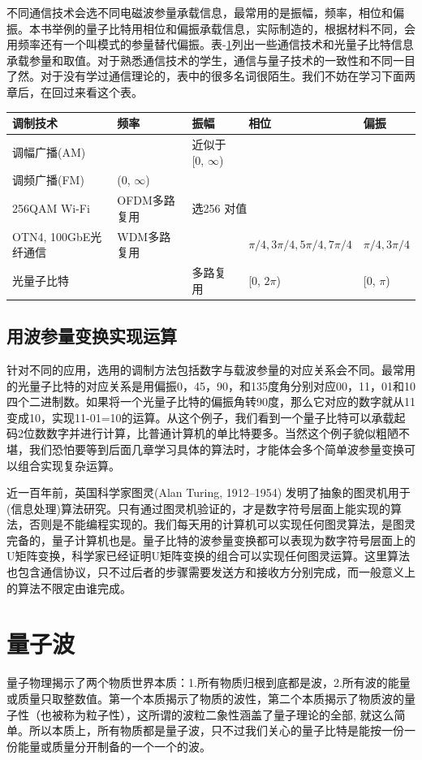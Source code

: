 \documentclass{ctexbook}
\begin{document}
不同通信技术会选不同电磁波参量承载信息，最常用的是振幅，频率，相位和偏振。本书举例的量子比特用相位和偏振承载信息，实际制造的，根据材料不同，会用频率还有一个叫模式的参量替代偏振。表-\ref{t-modulations}列出一些通信技术和光量子比特信息承载参量和取值。对于熟悉通信技术的学生，通信与量子技术的一致性和不同一目了然。对于没有学过通信理论的，表中的很多名词很陌生。我们不妨在学习下面两章后，在回过来看这个表。
\begin{table}[]\label{t-modulations}
\begin{tabular}{|l|l|l|l|l|}
\hline
调制技术 & 频率 & 振幅 & 相位 & 偏振   \\ \hline
调幅广播(AM) &  & 近似于[0, $\infty$) &  & \\ \hline
调频广播(FM) & (0, $\infty$) &  &  &  \\ \hline
256QAM Wi-Fi & OFDM多路复用 & \multicolumn{2}{l|}{选256 对值} & \\ \hline
OTN4, 100GbE光纤通信 & WDM多路复用 &  & $\pi/4, 3\pi/4, 5\pi/4, 7\pi/4$ & $\pi/4, 3\pi/4$ \\ \hline
光量子比特 &  & 多路复用 & [0, $2\pi$) & [0, $\pi$) \\ \hline
\end{tabular}
\end{table}

\subsection{用波参量变换实现运算}
针对不同的应用，选用的调制方法包括数字与载波参量的对应关系会不同。最常用的光量子比特的对应关系是用偏振0，45，90，和135度角分别对应00，11，01和10四个二进制数。如果将一个光量子比特的偏振角转90度，那么它对应的数字就从11变成10，实现11-01=10的运算。从这个例子，我们看到一个量子比特可以承载起码2位数数字并进行计算，比普通计算机的单比特要多。当然这个例子貌似粗陋不堪，我们恐怕要等到后面几章学习具体的算法时，才能体会多个简单波参量变换可以组合实现复杂运算。

近一百年前，英国科学家图灵(Alan Turing, 1912–1954) 发明了抽象的图灵机用于(信息处理)算法研究。只有通过图灵机验证的，才是数字符号层面上能实现的算法，否则是不能编程实现的。我们每天用的计算机可以实现任何图灵算法，是图灵完备的，量子计算机也是。量子比特的波参量变换都可以表现为数字符号层面上的U矩阵变换，科学家已经证明U矩阵变换的组合可以实现任何图灵运算。这里算法也包含通信协议，只不过后者的步骤需要发送方和接收方分别完成，而一般意义上的算法不限定由谁完成。


\section{量子波}
量子物理揭示了两个物质世界本质：1.所有物质归根到底都是波，2.所有波的能量或质量只取整数值。第一个本质揭示了物质的波性，第二个本质揭示了物质波的量子性（也被称为粒子性），这所谓的波粒二象性涵盖了量子理论的全部, 就这么简单。所以本质上，所有物质都是量子波，只不过我们关心的量子比特是能按一份一份能量或质量分开制备的一个一个的波。
\end{document}
